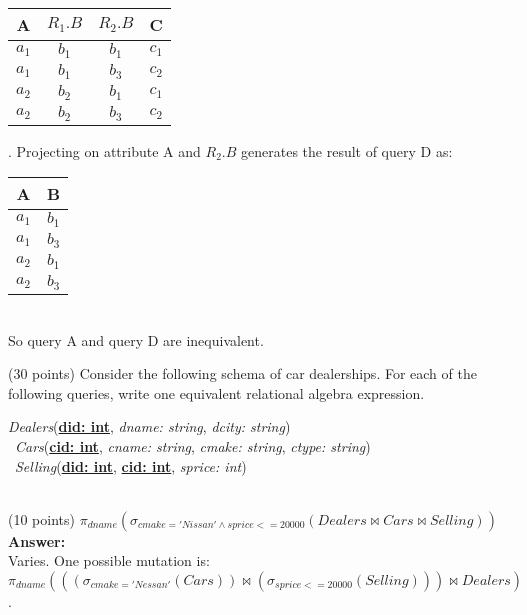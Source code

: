 \begin{questions}
\begin{tabular}{|c|c|c|c|}
    A & $R_1.B$ & $R_2.B$ & C \\
    \hline
    $a_1$ & $b_1$ & $b_1$ & $c_1$ \\
    \hline
    $a_1$ & $b_1$ & $b_3$ & $c_2$ \\
    \hline
    $a_2$ & $b_2$ & $b_1$ & $c_1$ \\
    \hline
    $a_2$ & $b_2$ & $b_3$ & $c_2$ \\
    \hline
\end{tabular}. 
Projecting on attribute A and $R_2.B$ generates the result of query D as:
\begin{tabular}{|c|c|}
    \hline
    A & B \\
    \hline
    $a_1$ & $b_1$ \\
    \hline
    $a_1$ & $b_3$ \\
    \hline
    $a_2$ & $b_1$ \\
    \hline
    $a_2$ & $b_3$ \\
    \hline
\end{tabular} \\
So query A and query D are inequivalent. 

\question (30 points) Consider the following schema of car dealerships. For each of the following queries, write one equivalent relational algebra expression. \\

\begin{addmargin}[1em]{2em}%

    \textit{Dealers}(\textbf{\underline{did: int}},  \textit{dname: string}, \textit{dcity: string})\\\
    \textit{Cars}(\textbf{\underline{cid: int}}, \textit{cname: string}, \textit{cmake: string}, \textit{ctype: string})\\\
    \textit{Selling}(\textbf{\underline{did: int}}, \textbf{\underline{cid: int}}, \textit{sprice: int})\\\
    
\end{addmargin}

\begin{choices}
    
    \choice (10 points) $\pi_{dname}(\sigma_{cmake='Nissan'\wedge sprice <= 20000}(Dealers\bowtie Cars\bowtie Selling))$ \\
    \textbf{Answer:} \\
    Varies. One possible mutation is: \\ $\pi_{dname}(((\sigma_{cmake='Nessan'}(Cars))\bowtie (\sigma_{sprice<=20000}(Selling)))\bowtie Dealers)$.
    

\end{choices}
\end{questions}
